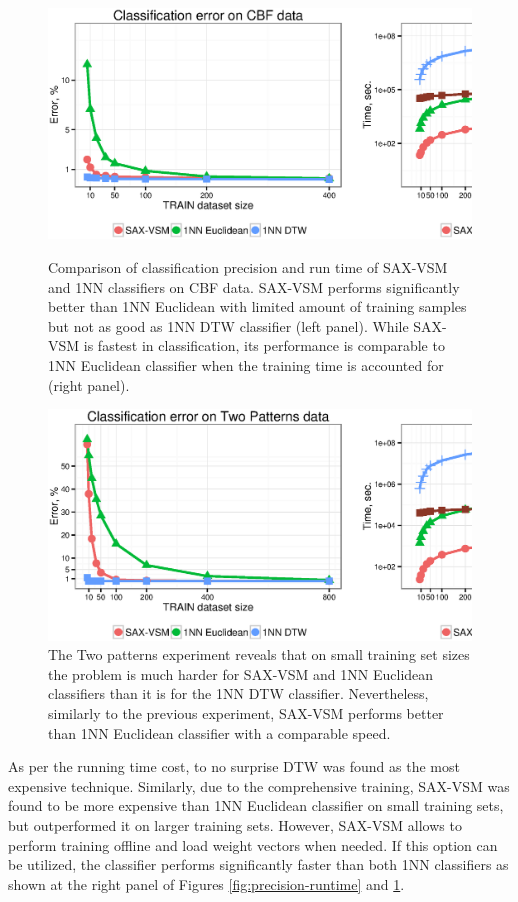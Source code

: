 \begin{figure}[t]
   \centering
   \includegraphics[width=140mm]{figures/cbf-precision-runtime.ps}
   \caption{Comparison of classification precision and run time of SAX-VSM and 1NN 
   classifiers on CBF data. SAX-VSM performs significantly better than 1NN Euclidean with limited 
   amount of training samples but not as good as 1NN DTW classifier (left panel). 
   While SAX-VSM is fastest in classification, its performance is comparable to 1NN Euclidean classifier 
   when the training time is accounted for (right panel).}
   \label{fig:precision-runtime}

   \includegraphics[width=140mm]{figures/2patterns-precision-runtime.ps}
   \caption{The Two patterns experiment reveals that on small training set sizes the problem is much harder 
   for SAX-VSM and 1NN Euclidean classifiers than it is for the 1NN DTW classifier. 
   Nevertheless, similarly to the previous experiment, SAX-VSM performs better than 1NN Euclidean classifier
   with a comparable speed.}
   \label{fig:2p-precision-runtime}
\end{figure}

As per the running time cost, to no surprise DTW was found as the most expensive technique. 
Similarly, due to the comprehensive training, SAX-VSM was found to be more expensive than 1NN Euclidean 
classifier on small training sets, but outperformed it on larger training sets.
However, SAX-VSM allows to perform training offline and load \tfidf weight vectors when needed. 
If this option can be utilized, the classifier performs significantly faster than both 1NN classifiers as 
shown at the right panel of Figures \ref{fig:precision-runtime} and \ref{fig:2p-precision-runtime}.

